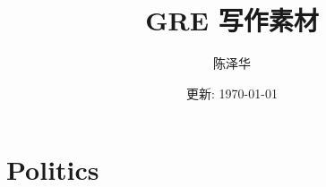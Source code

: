 \documentclass{report}
\title{GRE 写作素材}
\author{陈泽华}
\date{更新: \today}
\begin{document}
  \maketitle
  \tableofcontents

  \chapter{Politics}
  
  
  
  
  
  
\end{document}
